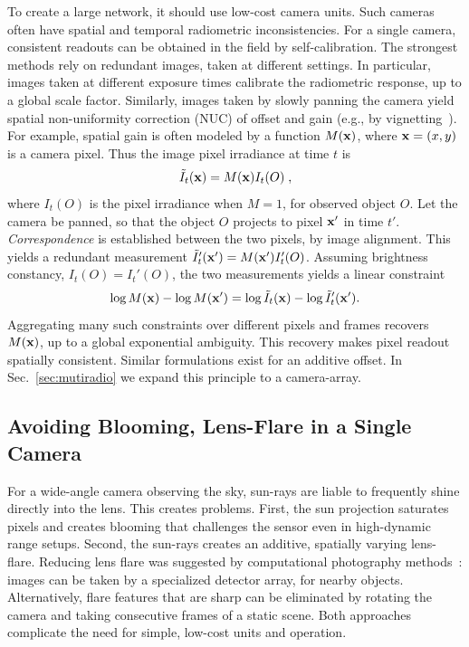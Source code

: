 \documentclass[runningheads]{llncs}
\begin{document}
To create a large network, it should use low-cost camera units. Such cameras often have spatial and temporal radiometric inconsistencies. For a single camera, consistent readouts can be obtained in the field by self-calibration. The strongest methods rely on redundant images, taken at different settings. In particular, images taken at different exposure times calibrate the radiometric response, up to a global scale factor. Similarly, images taken by slowly panning the camera yield spatial non-uniformity correction (NUC) of offset and gain (e.g., by vignetting~\cite{LitvinovCVPR05,Kang2000}). For example, spatial gain is often modeled by a function $M({\bf x})$, where \mbox{${\bf x}=(x,y)$} is a camera pixel. Thus the image pixel irradiance at time $t$ is
\begin{equation}
 \tilde{I}_t({\bf x}) = M({\bf x})I_t(O) \;,
 \label{eq:tilde_I}
\end{equation}
where $I_t(O)$ is the pixel irradiance when $M=1$, for observed object $O$. Let the camera be panned, so that the object $O$ projects to pixel ${\bf x}'$ in time $t'$.
{\em Correspondence} is established between the two pixels, by image alignment. This yields a redundant measurement $\tilde{I}_t'({\bf x}') = M({\bf x}')I_t'(O)$. Assuming brightness constancy, $I_t(O)=I_t'(O)$, the two measurements yields a linear constraint
\begin{equation}
 \log M({\bf x})- \log M({\bf x}')=\log \tilde{I}_t({\bf x})-\log \tilde{I}_t'({\bf x}').
 \label{eq:logM}
\end{equation}
Aggregating many such constraints over different pixels and frames recovers $M({\bf x})$, up to a global exponential ambiguity. This recovery makes pixel readout spatially consistent. Similar formulations exist for an additive offset. In Sec.~\ref{sec:mutiradio} we expand this principle to a camera-array.


\subsection{Avoiding Blooming, Lens-Flare in a Single Camera}
\label{sec:Signelflare}

For a wide-angle camera observing the sky, sun-rays are liable to frequently shine directly into the lens. This creates problems. First, the sun projection saturates pixels and creates blooming that challenges the sensor even in high-dynamic range setups. Second, the sun-rays creates an additive, spatially varying lens-flare. Reducing lens flare was suggested by computational photography methods~\cite{Koreban2009,Raskar2008,Talvala2007,Rouf2011}: images can be taken by a specialized detector array, for nearby objects. Alternatively, flare features that are sharp can be eliminated by rotating the camera and taking consecutive frames of a static scene. Both approaches complicate the need for simple, low-cost units and operation.
\end{document}
